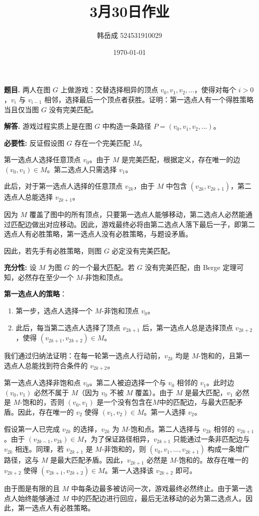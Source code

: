\documentclass[12pt, a4paper, oneside]{ctexart}
\title{\textbf{3月30日作业}}
\author{韩岳成 524531910029}
\date{\today}
\newcounter{problemname}
\newenvironment{problem}{\begin{shaded}\stepcounter{problemname}\par\noindent\textbf{题目\arabic{problemname}. }}{\end{shaded}\par}
\newenvironment{solution}{\par\noindent\textbf{解答. }}{\par}
\begin{document}
\maketitle

\begin{problem}
    两人在图 $G$ 上做游戏：交替选择相异的顶点 $v_0, v_1, v_2, \dots$，使得对每个 $i > 0$，$v_i$ 与 $v_{i-1}$ 相邻，选择最后一个顶点者获胜。证明：第一选点人有一个得胜策略当且仅当图 $G$ 没有完美匹配。
\end{problem}

\begin{solution}
   游戏过程实质上是在图 $G$ 中构造一条路径 $P = (v_0, v_1, v_2, \dots)$。

\textbf{必要性:}
反证假设图 $G$ 存在一个完美匹配 $M$。

第一选点人选择任意顶点 $v_0$。由于 $M$ 是完美匹配，根据定义，存在唯一的边 $(v_0, v_1) \in M$。第二选点人只需选择 $v_1$。

此后，对于第一选点人选择的任意顶点 $v_{2k}$，由于 $M$ 中包含 $(v_{2k}, v_{2k+1})$，第二选点人总能选择 $v_{2k+1}$。

因为 $M$ 覆盖了图中的所有顶点，只要第一选点人能够移动，第二选点人必然能通过匹配边做出对应移动。因此，游戏最终必将由第二选点人落下最后一子，即第二选点人有必胜策略，第一选点人没有必胜策略，与题设矛盾。

因此，若先手有必胜策略，则图 $G$ 必定没有完美匹配。

\textbf{充分性:}
设 $M$ 为图 $G$ 的一个最大匹配。若 $G$ 没有完美匹配，由 Berge 定理可知，必然存在至少一个 $M$-非饱和顶点。

\textbf{第一选点人的策略}：
\begin{enumerate}
    \item 第一步，选点人选择一个 $M$-非饱和顶点 $v_0$。
    \item 此后，每当第二选点人选择了顶点 $v_{2k+1}$ 后，第一选点人总是选择顶点 $v_{2k+2}$，使得 $(v_{2k+1}, v_{2k+2}) \in M$。
\end{enumerate}

我们通过归纳法证明：在每一轮第一选点人行动前，$v_{2k}$ 均是 $M$-饱和的，且第一选点人总能找到符合条件的 $v_{2k+2}$。

第一选点人选择非饱和点 $v_0$。第二人被迫选择一个与 $v_0$ 相邻的 $v_1$。此时边 $(v_0, v_1)$ 必然不属于 $M$（因为 $v_0$ 不被 $M$ 覆盖）。由于 $M$ 是最大匹配，$v_1$ 必然是 $M$-饱和的，否则 $(v_0, v_1)$ 是一个没有包含在$M$中的匹配边，与最大匹配矛盾。因此，存在唯一的 $v_2$ 使得 $(v_1, v_2) \in M$。第一人选择 $v_2$。
    
假设第一人已完成 $v_{2k}$ 的选择，$v_{2k}$ 为 $M$-饱和点。第二人选择与 $v_{2k}$ 相邻的 $v_{2k+1}$。由于 $(v_{2k-1}, v_{2k}) \in M$，为了保证路径相异，$v_{2k+1}$ 只能通过一条非匹配边与 $v_{2k}$ 相连。同理，若 $v_{2k+1}$ 是 $M$-非饱和的，则 $(v_0, v_1, \dots, v_{2k+1})$ 构成一条增广路径，这与 $M$ 是最大匹配矛盾。因此，$v_{2k+1}$ 必然是 $M$-饱和的。故存在唯一的 $v_{2k+2}$ 使得 $(v_{2k+1}, v_{2k+2}) \in M$。第一人选择该 $v_{2k+2}$ 即可。

由于图是有限的且 $M$ 中每条边最多被访问一次，游戏最终必然终止。由于第一选点人始终能够通过 $M$ 中的匹配边进行回应，最后无法移动的必为第二选点人。因此，第一选点人有必胜策略。
\end{solution}
\end{document}
